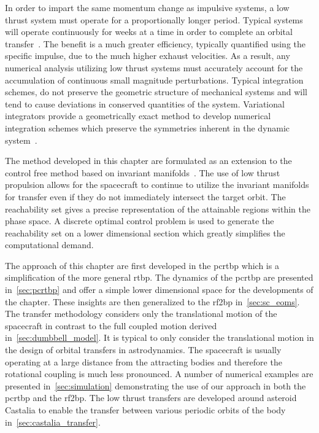 In order to impart the same momentum change as impulsive systems, a low thrust system must operate for a proportionally longer period.
Typical systems will operate continuously for weeks at a time in order to complete an orbital transfer~\cite{choueiri2009}.
The benefit is a much greater efficiency, typically quantified using the specific impulse, due to the much higher exhaust velocities.
As a result, any numerical analysis utilizing low thrust systems must accurately account for the accumulation of continuous small magnitude perturbations.
Typical integration schemes, do not preserve the geometric structure of mechanical systems and will tend to cause deviations in conserved quantities of the system.
Variational integrators provide a geometrically exact method to develop numerical integration schemes which preserve the symmetries inherent in the dynamic system~\cite{west2004,marsden2001,kulumani2018}.

The method developed in this chapter are formulated as an extension to the control free method based on invariant manifolds~\cite{koon2011}.
The use of low thrust propulsion allows for the spacecraft to continue to utilize the invariant manifolds for transfer even if they do not immediately intersect the target orbit.
The reachability set gives a precise representation of the attainable regions within the phase space.
A discrete optimal control problem is used to generate the reachability set on a lower dimensional \Poincare section which greatly simplifies the computational demand.

The approach of this chapter are first developed in the \gls{pcrtbp} which is a simplification of the more general \gls{rtbp}.
The dynamics of the \gls{pcrtbp} are presented in~\cref{sec:pcrtbp} and offer a simple lower dimensional space for the developments of the chapter.
These insights are then generalized to the \gls{rf2bp} in~\cref{sec:sc_eoms}.
The transfer methodology considers only the translational motion of the spacecraft in contrast to the full coupled motion derived in~\cref{sec:dumbbell_model}.
It is typical to only consider the translational motion in the design of orbital transfers in astrodynamics.
The spacecraft is usually operating at a large distance from the attracting bodies and therefore the rotational coupling is much less pronounced.
A number of numerical examples are presented in~\cref{sec:simulation} demonstrating the use of our approach in both the \gls{pcrtbp} and the \gls{rf2bp}.
The low thrust transfers are developed around asteroid Castalia to enable the transfer between various periodic orbits of the body in~\cref{sec:castalia_transfer}.

